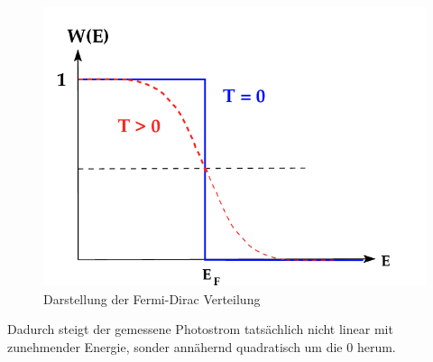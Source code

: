\begin{figure}[H]
    \includegraphics{Bilder/fermi-dirac.png}
    \centering
    \caption{Darstellung der Fermi-Dirac Verteilung}
    \label{fig:fermidirac}
\end{figure}
\noindent Dadurch steigt der gemessene Photostrom tatsächlich nicht linear mit zunehmender Energie, sonder annähernd quadratisch
um die $0$ herum.
\cite{V500}
